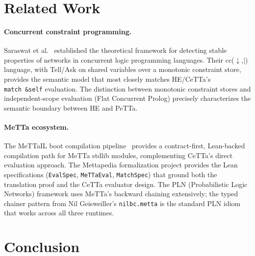 \documentclass[11pt]{article}
\newcommand{\code}[1]{\texttt{#1}}
\newcommand{\PeTTa}{\textup{PeTTa}}
\newcommand{\HE}{\textup{HE}}
\newcommand{\CeTTa}{\textup{CeTTa}}
\begin{document}
\section{Related Work}

\paragraph{Concurrent constraint programming.}
Saraswat et al.~\cite{saraswat1988} established the theoretical
framework for detecting stable properties of networks in concurrent
logic programming languages.  Their cc($\downarrow$,$|$) language,
with Tell/Ask on shared variables over a monotonic constraint store,
provides the semantic model that most closely matches \HE{}/\CeTTa{}'s
\code{match~\&self} evaluation.  The distinction between monotonic
constraint stores and independent-scope evaluation (Flat Concurrent
Prolog) precisely characterizes the semantic boundary between \HE{} and
\PeTTa{}.

\paragraph{MeTTa ecosystem.}
The MeTTaIL boot compilation pipeline~\cite{mettail} provides a
contract-first, Lean-backed compilation path for MeTTa stdlib modules,
complementing \CeTTa{}'s direct evaluation approach.  The Mettapedia
formalization project provides the Lean specifications (\code{EvalSpec},
\code{MeTTaEval}, \code{MatchSpec}) that ground both the translation
proof and the \CeTTa{} evaluator design.  The PLN (Probabilistic Logic
Networks) framework uses MeTTa's backward chaining extensively; the
typed chainer pattern from Nil Geisweiller's \code{nilbc.metta} is
the standard PLN idiom that works across all three runtimes.

\section{Conclusion}
\end{document}
